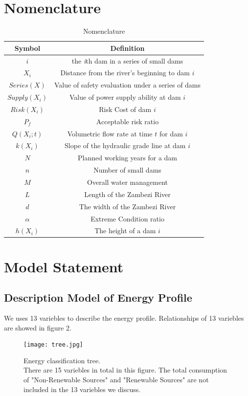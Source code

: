 \documentclass{mcmthesis}
\begin{document}
\section{Nomenclature}\label{Sec-Nomen}
%
\begin{table}[!h]
    \centering
    \caption{Nomenclature}
    \label{tab:Nomen}
    \begin{tabular}{c c}
\hline
    	Symbol & Definition\\
\hline
	$i$ & the \emph{i}th dam in a series of small dams\\
	$X_i$ & Distance from the river's beginning to dam $i$\\
	$Series(X)$ & Value of safety evaluation under a series of dams\\
	$Supply(X_i)$ & Value of power supply ability at dam $i$\\
	$Risk(X_i)$ & Risk Cost of dam $i$\\
	$P_f$ & Acceptable risk ratio\\
	$Q(X_i;t)$ & Volumetric flow rate at time $t$ for dam $i$\\
	$k(X_i)$ & Slope of the hydraulic grade line at dam $i$\\
	$N$ & Planned working years for a dam\\
	$n$ & Number of small dams\\
	$M$ & Overall water management\\
	$L$ & Length of the Zambezi River\\
	$d$ & The width of the Zambezi River\\
	$\alpha$& Extreme Condition ratio\\
	$h(X_i)$ & The height of a dam $i$\\
\hline
    \end{tabular}
\end{table}

\section{Model Statement} \label{Sec-Model}
%
\subsection{Description Model of Energy Profile}
We uses 13 variebles to describe the energy profile. Relationships of 13 variebles are showed in figure 2.\\
\begin{figure}[htbp]
    \centering
    \texttt{[image: tree.jpg]}
    \caption{Energy classification tree.\\There are 15 variebles in total in this figure. The total consumption of "Non-Renewable Sources" and "Renewable Sources" are not included in the 13 variebles we discuss.}
\end{figure}
\end{document}
